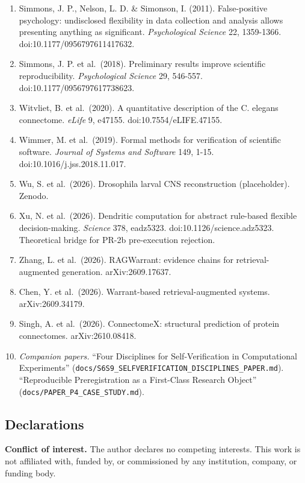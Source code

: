 \documentclass[
]{article}
\begin{document}
\begin{enumerate}
\item
  Simmons, J. P., Nelson, L. D. \& Simonson, I. (2011). False-positive
  psychology: undisclosed flexibility in data collection and analysis
  allows presenting anything as significant. \emph{Psychological
  Science} 22, 1359-1366. doi:10.1177/0956797611417632.
\item
  Simmons, J. P. et al.~(2018). Preliminary results improve scientific
  reproducibility. \emph{Psychological Science} 29, 546-557.
  doi:10.1177/0956797617738623.
\item
  Witvliet, B. et al.~(2020). A quantitative description of the C.
  elegans connectome. \emph{eLife} 9, e47155. doi:10.7554/eLIFE.47155.
\item
  Wimmer, M. et al.~(2019). Formal methods for verification of
  scientific software. \emph{Journal of Systems and Software} 149, 1-15.
  doi:10.1016/j.jss.2018.11.017.
\item
  Wu, S. et al.~(2026). Drosophila larval CNS reconstruction
  (placeholder). Zenodo.
\item
  Xu, N. et al.~(2026). Dendritic computation for abstract rule-based
  flexible decision-making. \emph{Science} 378, eadz5323.
  doi:10.1126/science.adz5323. Theoretical bridge for PR-2b
  pre-execution rejection.
\item
  Zhang, L. et al.~(2026). RAGWarrant: evidence chains for
  retrieval-augmented generation. arXiv:2609.17637.
\item
  Chen, Y. et al.~(2026). Warrant-based retrieval-augmented systems.
  arXiv:2609.34179.
\item
  Singh, A. et al.~(2026). ConnectomeX: structural prediction of protein
  connectomes. arXiv:2610.08418.
\item
  \emph{Companion papers.} ``Four Disciplines for Self-Verification in
  Computational Experiments''
  (\texttt{docs/S6S9\_SELFVERIFICATION\_DISCIPLINES\_PAPER.md}).
  ``Reproducible Preregistration as a First-Class Research Object''
  (\texttt{docs/PAPER\_P4\_CASE\_STUDY.md}).
\end{enumerate}

\subsection{Declarations}\label{declarations}

\textbf{Conflict of interest.} The author declares no competing
interests. This work is not affiliated with, funded by, or commissioned
by any institution, company, or funding body.
\end{document}
